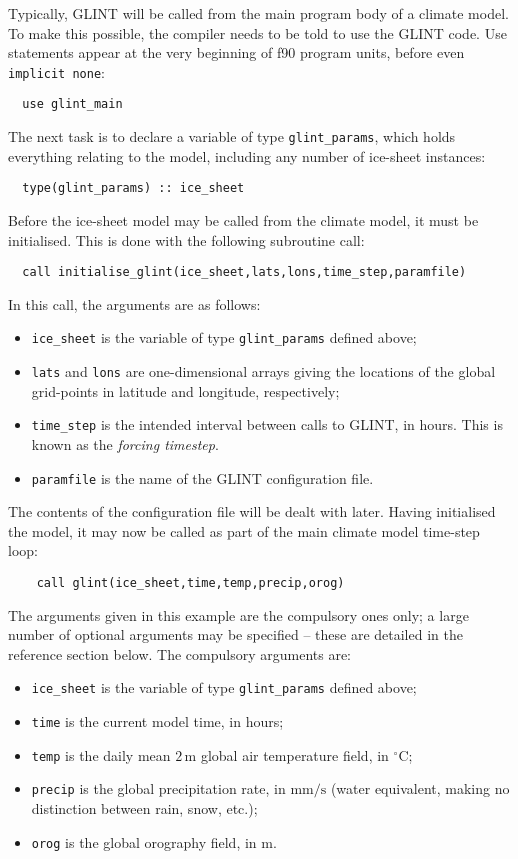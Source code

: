 Typically, GLINT will be called from the main program body of a
climate model. To make this possible, the compiler needs to be told to use the
GLINT code. Use statements appear at the very beginning of f90 program
units, before even \texttt{implicit none}:
%
\begin{verbatim}
  use glint_main
\end{verbatim}
%
The next task is to declare a variable of type \texttt{glint\_params}, which
holds everything relating to the model, including any number of ice-sheet
instances:
%
\begin{verbatim}
  type(glint_params) :: ice_sheet
\end{verbatim}
%
Before the ice-sheet model may be called from the climate model, it must be
initialised. This is done with the following subroutine call:
%
\begin{verbatim}
  call initialise_glint(ice_sheet,lats,lons,time_step,paramfile)
\end{verbatim}
%
In this call, the arguments are as follows:
%
\begin{itemize}
\item \texttt{ice\_sheet} is the variable of type \texttt{glint\_params}
 defined above;
\item \texttt{lats} and \texttt{lons} are one-dimensional arrays giving the
  locations of the global grid-points in latitude and longitude, respectively;
\item \texttt{time\_step} is the intended interval between calls to GLINT, in
hours. This is known as the \emph{forcing timestep}. 
\item \texttt{paramfile} is the name of the GLINT configuration file.
\end{itemize}
%
The contents of the configuration file will be dealt with later. Having
initialised the model, it may now be called as part of the main climate
model time-step loop:
%
\begin{verbatim}
    call glint(ice_sheet,time,temp,precip,orog)
\end{verbatim} 
%
The arguments given in this example are the compulsory ones only; a large number of
optional arguments may be specified -- these are detailed in the reference
section below. The compulsory arguments are:
%
\begin{itemize}
\item \texttt{ice\_sheet} is the variable of type \texttt{glint\_params}
 defined above;
\item \texttt{time} is the current model time, in hours;
\item \texttt{temp} is the daily mean $2\,\mathrm{m}$ global air temperature field, in
  $^{\circ}\mathrm{C}$;
\item \texttt{precip} is the global precipitation rate,
  in $\mathrm{mm/s}$ (water equivalent, making no distinction
  between rain, snow, etc.);
\item \texttt{orog} is the global orography field, in $\mathrm{m}$.
\end{itemize}
